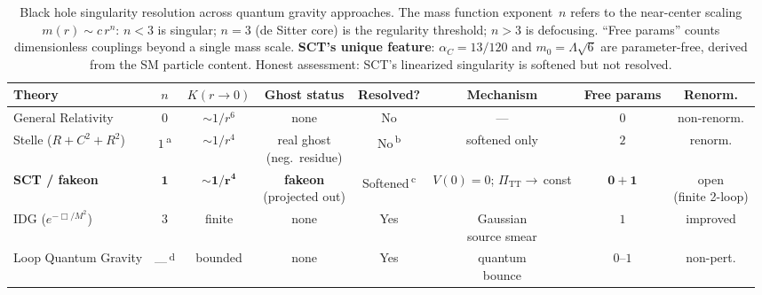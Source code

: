 \begin{table}[p]
\centering
\caption{Black hole singularity resolution across quantum gravity approaches.
  The mass function exponent~$n$ refers to the near-center scaling
  $m(r) \sim c\,r^n$: $n < 3$ is singular; $n = 3$ (de Sitter core) is the
  regularity threshold; $n > 3$ is defocusing.
  ``Free params'' counts dimensionless couplings beyond a single mass scale.
  \textbf{SCT's unique feature}: $\alpha_C = 13/120$ and $m_0 = \Lambda\sqrt{6}$
  are parameter-free, derived from the SM particle content.
  Honest assessment: SCT's linearized singularity is softened but not resolved.}
\label{tab:qg_singularity}
\small
\renewcommand{\arraystretch}{1.25}
\begin{adjustbox}{max width=\textwidth}
\begin{tabular}{@{} l c c c c c c c @{}}
\toprule
\textbf{Theory}
  & \textbf{$n$}
  & \textbf{$K(r\!\to\!0)$}
  & \textbf{Ghost status}
  & \textbf{Resolved?}
  & \textbf{Mechanism}
  & \textbf{Free params}
  & \textbf{Renorm.}\\
\midrule

General Relativity
  & $0$
  & $\sim 1/r^6$
  & none
  & \textcolor{notresolved}{No}
  & ---
  & $0$
  & non-renorm.\\

Stelle ($R + C^2 + R^2$)
  & $1$\,\textsuperscript{a}
  & $\sim 1/r^4$
  & \makecell{real ghost\\[-2pt]\scriptsize(neg.\ residue)}
  & \textcolor{notresolved}{No}\,\textsuperscript{b}
  & softened only
  & $2$
  & renorm.\\

\textbf{SCT / fakeon}
  & $\mathbf{1}$
  & $\sim \mathbf{1/r^4}$
  & \makecell{\textbf{fakeon}\\[-2pt]\scriptsize(projected out)}
  & \textcolor{softened}{Softened}\,\textsuperscript{c}
  & \makecell{$V(0)=0$;\\[-2pt]$\Pi_{\mathrm{TT}}\to\,$const}
  & $\mathbf{0{+}1}$
  & \makecell{open\\[-2pt]\scriptsize(finite 2-loop)}\\

IDG ($e^{-\Box/M^2}$)
  & $3$
  & finite
  & none
  & \textcolor{resolved}{Yes}
  & \makecell{Gaussian\\[-2pt]source smear}
  & $1$
  & improved\\

Loop Quantum Gravity
  & ---\,\textsuperscript{d}
  & bounded
  & none
  & \textcolor{resolved}{Yes}
  & \makecell{quantum\\[-2pt]bounce}
  & $0$--$1$
  & non-pert.\\


\end{tabular}
\end{adjustbox}
\end{table}
